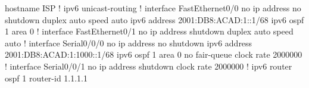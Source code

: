 hostname ISP
!
ipv6 unicast-routing
!
interface FastEthernet0/0
 no ip address
 no shutdown
 duplex auto
 speed auto
 ipv6 address 2001:DB8:ACAD:1::1/68
 ipv6 ospf 1 area 0
!
interface FastEthernet0/1
 no ip address
 shutdown
 duplex auto
 speed auto
!
interface Serial0/0/0
 no ip address
 no shutdown
 ipv6 address 2001:DB8:ACAD:1:1000::1/68
 ipv6 ospf 1 area 0
 no fair-queue
 clock rate 2000000
!
interface Serial0/0/1
 no ip address
 shutdown
 clock rate 2000000
!
ipv6 router ospf 1
 router-id 1.1.1.1
